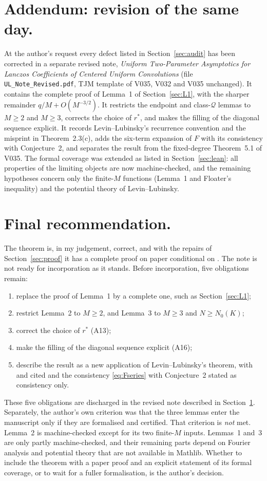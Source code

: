 \documentclass[11pt,a4paper]{article}
\theoremstyle{remark}
\numberwithin{equation}{section}
\begin{document}
\section{Addendum: revision of the same day.}\label{sec:addendum}
At the author's request every defect listed in Section~\ref{sec:audit} has been corrected in a
separate revised note, \emph{Uniform Two-Parameter Asymptotics for Lanczos Coefficients of Centered
Uniform Convolutions} (file \texttt{UL\_Note\_Revised.pdf}, TJM template of V035, V032 and V035
unchanged). It contains the complete proof of Lemma~1 of Section~\ref{sec:L1}, with the sharper
remainder $q/M+O(M^{-3/2})$. It restricts the endpoint and class-$\mathcal Q$ lemmas to $M\ge2$ and
$M\ge3$, corrects the choice of $r^*$, and makes the filling of the diagonal sequence explicit. It
records Levin--Lubinsky's recurrence convention and the misprint in Theorem~2.3(c), adds the
six-term expansion of $F$ with its consistency with Conjecture~2, and separates the result from
the fixed-degree Theorem~5.1 of V035. The formal coverage was extended as listed in
Section~\ref{sec:lean}: all properties of the limiting objects are now machine-checked, and the
remaining hypotheses concern only the finite-$M$ functions (Lemma~1 and Floater's inequality) and
the potential theory of Levin--Lubinsky.

\section{Final recommendation.}\label{sec:rec}

The theorem is, in my judgement, correct, and with the repairs of
Section~\ref{sec:proof} it has a complete proof on paper conditional on
\cite[Theorem~13.4]{levinlubinsky2018}. The note is not ready for incorporation as
it stands. Before incorporation, five obligations remain:
\begin{enumerate}
\item replace the proof of Lemma~1 by a complete one, such as Section~\ref{sec:L1};
\item restrict Lemma~2 to $M\ge2$, and Lemma~3 to $M\ge3$ and $N\ge N_0(K)$;
\item correct the choice of $r^*$ (A13);
\item make the filling of the diagonal sequence explicit (A16);
\item describe the result as a new application of Levin--Lubinsky's theorem, with
\cite{milovanovic2017} and \cite{gautschi2017} cited and the consistency
\eqref{eq:Fseries} with Conjecture~2 stated as consistency only.
\end{enumerate}
These five obligations are discharged in the revised note described in
Section~\ref{sec:addendum}. Separately, the author's own criterion was that the three lemmas enter
the manuscript only if they are formalised and certified. That criterion is \emph{not} met. Lemma~2
is machine-checked except for its two finite-$M$ inputs. Lemmas~1 and~3 are only partly
machine-checked, and their remaining parts depend on Fourier analysis and potential theory
that are not available in Mathlib. Whether to include the theorem with a paper proof and
an explicit statement of its formal coverage, or to wait for a fuller formalisation, is the
author's decision.
\end{document}
